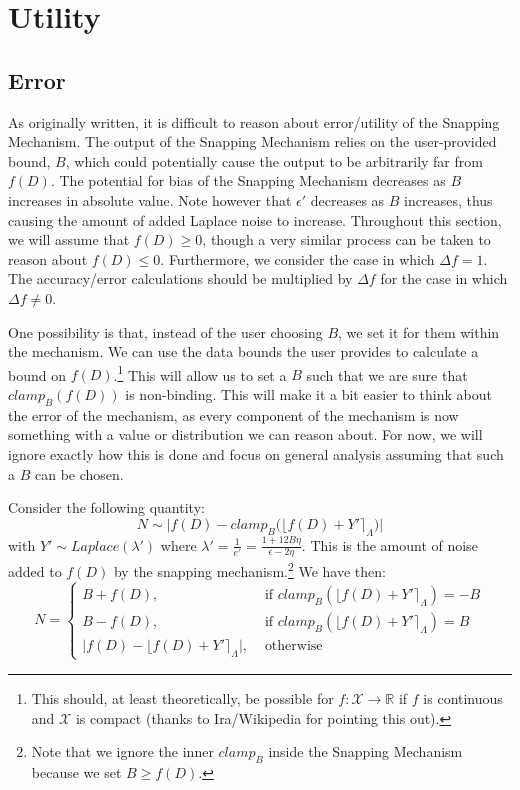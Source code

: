 \documentclass[11pt]{scrartcl} %
\begin{document}
\section{Utility}
\subsection{Error}
As originally written, it is difficult to reason about error/utility of the Snapping Mechanism. The output of the Snapping Mechanism relies on the user-provided bound, $B$, which could potentially cause the output to be arbitrarily far from $f(D)$. The potential for bias of the Snapping Mechanism decreases as $B$ increases in absolute value. Note however that $\epsilon'$ decreases as $B$ increases, thus causing the amount of added Laplace noise to increase. Throughout this section, we will assume that $f(D) \geq 0$, though a very similar process can be taken to reason about $f(D) \leq 0$. Furthermore, we consider the case in which $\Delta f = 1$.
The accuracy/error calculations should be multiplied by $\Delta f$ for the case in which $\Delta f \neq 0$. \newline

One possibility is that, instead of the user choosing $B$, we set it for them within the mechanism. We can use the data bounds the user provides to calculate a bound on $f(D)$.\footnote{This should, at least theoretically, be possible for $f: \mathcal{X} \rightarrow \mathbb{R}$ if $f$ is continuous and $\mathcal{X}$ is compact (thanks to Ira/Wikipedia for pointing this out).} This will allow us to set a $B$ such that we are sure that $clamp_B \left( f(D) \right)$ is non-binding. This will make it a bit easier to think about the error of the mechanism, as every component of the mechanism is now something with a value or distribution we can reason about.
For now, we will ignore exactly how this is done and focus on general analysis assuming that such a $B$ can be chosen.

Consider the following quantity:
\[ N \sim \big \vert f(D) - clamp_B \big( \lfloor f(D) + Y' \rceil_{\Lambda} \big) \big \vert \]
with $Y' \sim Laplace(\lambda')$ where $\lambda' = \frac{1}{e'} = \frac{1 + 12B \eta}{\epsilon - 2\eta}$. This is the amount of noise added to $f(D)$ by the snapping mechanism.\footnote{Note that we ignore the inner $clamp_B$ inside the Snapping Mechanism because we set $B \geq f(D)$.} We have then:
\begin{equation}
	N =
		\label{snapped_noise}
		\begin{cases}
			B + f(D), &\text{ if } clamp_B \left( \lfloor f(D) + Y' \rceil_{\Lambda} \right) = -B  \\
			B - f(D), &\text{ if } clamp_B \left( \lfloor f(D) + Y' \rceil_{\Lambda} \right) = B  \\
			\big\vert f(D) - \lfloor f(D) + Y' \rceil_{\Lambda} \big\vert, &\text{ otherwise }
		\end{cases}
\end{equation}
\end{document}
